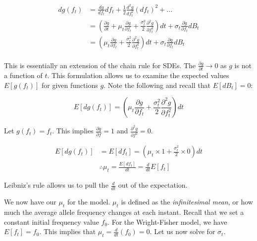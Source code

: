 \begin{equation}
    \begin{split}
        dg(f_t) 
                &= \frac{dg}{df_t}df_t + \frac{1}{2} \frac{d^2g}{df_t^2}(df_t)^2 + ... \\
                &= (\frac{\partial g}{\partial t} + \mu_t \frac{\partial g}{\partial f_t} + \frac{\sigma_t^2}{2} \frac{\partial^2 g}{\partial f_t^2})dt + \sigma_t \frac{\partial g}{\partial f_t}dB_t \\
                &= (\mu_t \frac{\partial g}{\partial f_t} + \frac{\sigma_t^2}{2} \frac{\partial^2 g}{\partial f_t^2})dt + \sigma_t \frac{\partial g}{\partial f_t}dB_t \\
    \end{split}
\end{equation}


This is essentially an extension of the chain rule for SDEs. The $\frac{\partial g}{\partial t} \to 0$ as $g$ is not a function of $t$. This formulation allows us to examine the expected values $E[g(f_t)]$ for given functions $g$. Note the following and recall that $E[dB_t] = 0$:

\begin{equation}
    E[dg(f_t)] = (\mu_t \frac{\partial g}{\partial f_t} + \frac{\sigma_t^2}{2} \frac{\partial^2 g}{\partial f_t^2})dt
\end{equation}


Let $g(f_t) = f_t$. This implies $\frac{\partial g}{\partial f} = 1$ and $\frac{\partial^2 g}{\partial f^2} = 0$.


\begin{equation}
    \begin{split}
         E[dg(f_t)] &= E[df_t] = (\mu_t \times 1 + \frac{\sigma_t^2}{2} \times 0)dt \\
         & \therefore \mu_t = \frac{E[df_t]}{dt} = \frac{d}{dt}E[f_t]
    \end{split}
\end{equation}


Leibniz's rule allows us to pull the $\frac{d}{dt}$ out of the expectation. 


We now have our $\mu_t$ for the model. $\mu_t$ is defined as the \textit{infinitesimal mean}, or how much the average allele frequency changes at each instant. Recall that we set a constant initial frequency value $f_0$. For the Wright-Fisher model, we have $E[f_t] = f_0$. This implies that $\mu_t = \frac{d}{dt} (f_0) = 0$. Let us now solve for $\sigma_t$.


